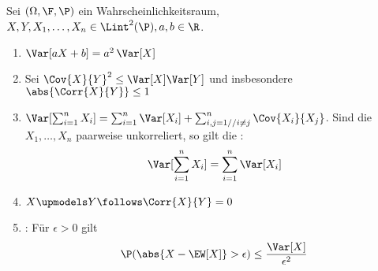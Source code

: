 \begin{proposition}
	\label{5_13_proposition}
	Sei $(\Omega,\F,\P)$ ein Wahrscheinlichkeitsraum, $X,Y, X_1, \dots, X_n \in \Lint^{2}(\P), a,b \in \R$.
	\begin{enumerate}[leftmargin=*, nolistsep]
		\item $\Var[aX + b] = a^2 \, \Var[X]$
		\item  Sei $\Cov{X}{Y}^2 \le \Var[X] \Var[Y]$ und insbesondere $\abs{\Corr{X}{Y}} \le 1$
		\item $\Var[\sum_{i=1}^n X_i] = \sum_{i=1}^n \Var[X_i] + \sum_{\substack{i,j=1//i\neq j}}^n \Cov{X_i}{X_j}$. Sind die $X_1, \dots, X_n$ paarweise unkorreliert, so gilt die :
		\begin{equation*}
			\Var[\sum_{i=1}^n X_i] = \sum_{i=1}^n \Var[X_i]
		\end{equation*}
		\item $X \upmodels Y \follows \Corr{X}{Y} = 0$
		\item {}: Für $\epsilon > 0$ gilt
		\begin{equation*}
			\P(\abs{X - \EW[X]} > \epsilon) \le \frac{\Var[X]}{\epsilon^2}
		\end{equation*}
	\end{enumerate}
\end{proposition}

